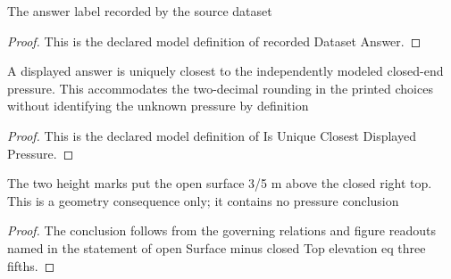 \begin{definition}
  \label{def:physics:phyx-mini-0721:phyxminiproblems-problemphyxmini0721-recordeddatasetanswer}
  The answer label recorded by the source dataset
\end{definition}
\begin{proof}
  This is the declared model definition of recorded Dataset Answer.
\end{proof}
\begin{definition}
  \label{def:physics:phyx-mini-0721:phyxminiproblems-problemphyxmini0721-isuniqueclosestdisplayedpressure}
  A displayed answer is uniquely closest to the independently modeled closed-end pressure. This accommodates the two-decimal rounding in the printed choices without identifying the unknown pressure by definition
\end{definition}
\begin{proof}
  This is the declared model definition of Is Unique Closest Displayed Pressure.
\end{proof}
\begin{lemma}
  \label{lem:physics:phyx-mini-0721:phyxminiproblems-problemphyxmini0721-opensurface-minus-closedtop-elevation-eq-three-fifths}
  The two height marks put the open surface 3/5 m above the closed right top. This is a geometry consequence only; it contains no pressure conclusion
\end{lemma}
\begin{proof}
  The conclusion follows from the governing relations and figure readouts named in the statement of open Surface minus closed Top elevation eq three fifths.
\end{proof}
